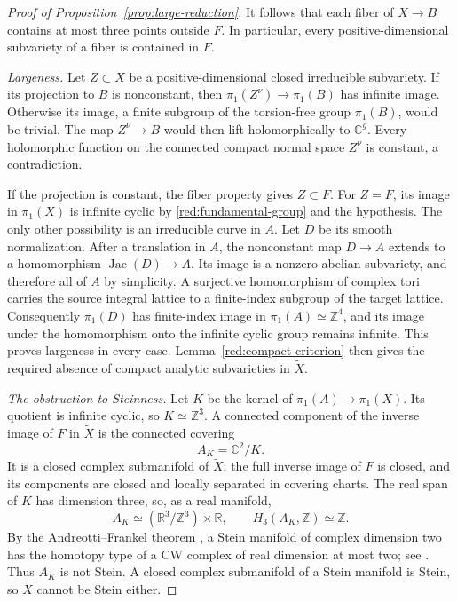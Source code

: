 \documentclass[11pt,reqno]{amsart}
\numberwithin{equation}{section}
\theoremstyle{definition}
\theoremstyle{remark}
\begin{document}
\begin{proof}[Proof of Proposition~\ref{prop:large-reduction}]
It follows that each fiber of $X\to B$ contains at most three points
outside $F$.  In particular, every positive-dimensional subvariety of
a fiber is contained in $F$.

 
 \emph{Largeness.}
Let $Z\subset X$ be a positive-dimensional closed irreducible
subvariety.  If its projection to $B$ is nonconstant, then
$\pi_1(Z^\nu)\to\pi_1(B)$ has infinite image.  Otherwise its image,
a finite subgroup of the torsion-free group $\pi_1(B)$, would be
trivial.  The map $Z^\nu\to B$ would then lift holomorphically to
$\mathbb C^g$.  Every holomorphic function on the connected compact normal
space $Z^\nu$ is constant, a contradiction.

If the projection is constant, the fiber property gives $Z\subset F$.
For $Z=F$, its image in $\pi_1(X)$ is infinite cyclic by
\eqref{red:fundamental-group} and the hypothesis.  The only other
possibility is an irreducible curve in $A$.  Let $D$ be its smooth
normalization.  After a translation in $A$, the nonconstant map
$D\to A$ extends to a homomorphism $\operatorname{Jac}(D)\to A$.  Its image is a
nonzero abelian subvariety, and therefore all of $A$ by simplicity.
A surjective homomorphism of complex tori carries the source integral
lattice to a finite-index subgroup of the target lattice.  Consequently
$\pi_1(D)$ has finite-index image in $\pi_1(A)\simeq\mathbb Z^4$, and its
image under the homomorphism onto the infinite cyclic group remains
infinite.  This proves largeness in every case.  Lemma~\ref{red:compact-criterion}
then gives the required absence of compact analytic subvarieties in
$\widetilde X$.

 
 \emph{The obstruction to Steinness.}
Let $K$ be the kernel of $\pi_1(A)\to\pi_1(X)$.  Its quotient is
infinite cyclic, so $K\simeq\mathbb Z^3$.  A connected component of the
inverse image of $F$ in $\widetilde X$ is the connected covering
\[
 A_K=\mathbb C^2/K.
\]
It is a closed complex submanifold of $\widetilde X$: the full inverse
image of $F$ is closed, and its components are closed and locally
separated in covering charts.  The real span of $K$ has dimension
three, so, as a real manifold,
\[
 A_K\simeq(\mathbb R^3/\mathbb Z^3)\times\mathbb R,
 \qquad H_3(A_K,\mathbb Z)\simeq\mathbb Z.
\]
By the Andreotti--Frankel theorem \cite{AndreottiFrankel1959}, a Stein
manifold of complex dimension two has the homotopy type of a CW complex of real dimension at most
two; see \cite[Theorem~7.2]{MilnorMorse}.  Thus $A_K$ is not Stein.
A closed complex submanifold of a Stein manifold is Stein, so
$\widetilde X$ cannot be Stein either.
\end{proof}
\end{document}
